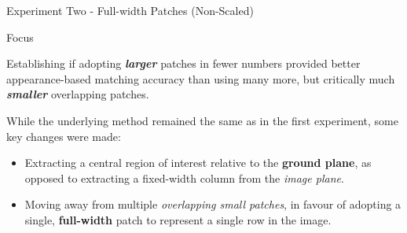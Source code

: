 \documentclass[10pt, compress]{beamer}
\begin{document}
%
%
%
%

\begin{frame}{Experiment Two - Full-width Patches (Non-Scaled)}

\begin{block}{Focus}

Establishing if adopting \textbf{\textit{larger}} patches in fewer numbers provided better appearance-based matching accuracy than using many more, but critically much \textbf{\textit{smaller}} overlapping patches.
	
\end{block}

While the underlying method remained the same as in the first experiment, some key changes were made:

 \begin{itemize}[label={\textbullet}]
  	\item Extracting a central region of interest relative to the \textbf{ground plane}, as opposed to extracting a fixed-width column from the \textit{image plane}.
  	\item Moving away from multiple \textit{overlapping small patches}, in favour of adopting a single, \textbf{full-width} patch to represent a single row in the image.
  \end{itemize}

\end{frame}
\end{document}
